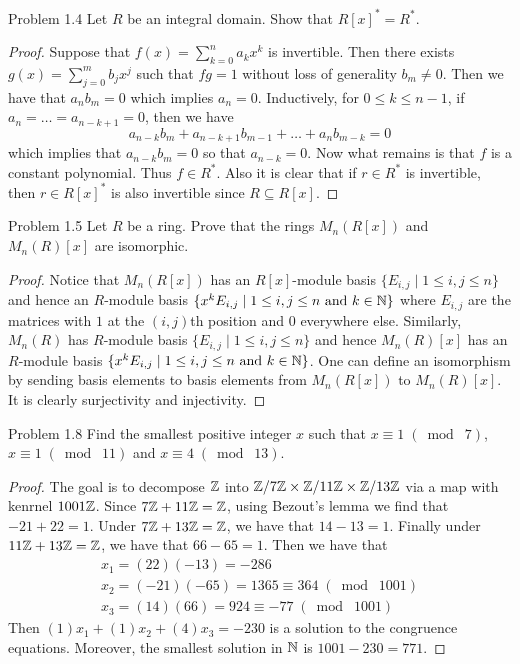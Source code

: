 \documentclass[a4paper]{article}
\begin{document}
\begin{ex}{Problem 1.4}{} Let $R$ be an integral domain. Show that $R[x]^\ast=R^\ast$. \tcbline
\begin{proof}
Suppose that $f(x)=\sum_{k=0}^na_kx^k$ is invertible. Then there exists $g(x)=\sum_{j=0}^mb_jx^j$ such that $fg=1$ without loss of generality $b_m\neq 0$. Then we have that $a_nb_m=0$ which implies $a_n=0$. Inductively, for $0\leq k\leq n-1$, if $a_n=\dots=a_{n-k+1}=0$, then we have $$a_{n-k}b_m+a_{n-k+1}b_{m-1}+\dots+a_nb_{m-k}=0$$ which implies that $a_{n-k}b_m=0$ so that $a_{n-k}=0$. Now what remains is that $f$ is a constant polynomial. Thus $f\in R^\ast$. Also it is clear that if $r\in R^\ast$ is invertible, then $r\in R[x]^\ast$ is also invertible since $R\subseteq R[x]$. 
\end{proof}
\end{ex}

\begin{ex}{Problem 1.5}{} Let $R$ be a ring. Prove that the rings $M_n(R[x])$ and $M_n(R)[x]$ are isomorphic. \tcbline
\begin{proof}
Notice that $M_n(R[x])$ has an $R[x]$-module basis $\{E_{i,j}\;|\;1\leq i,j\leq n\}$ and hence an $R$-module basis $\{x^kE_{i,j}\;|\;1\leq i,j\leq n\text{ and }k\in\mathbb{N}\}$ where $E_{i,j}$ are the matrices with $1$ at the $(i,j)$th position and $0$ everywhere else. Similarly, $M_n(R)$ has $R$-module basis $\{E_{i,j}\;|\;1\leq i,j\leq n\}$ and hence $M_n(R)[x]$ has an $R$-module basis $\{x^kE_{i,j}\;|\;1\leq i,j\leq n\text{ and }k\in\mathbb{N}\}$. One can define an isomorphism by sending basis elements to basis elements from $M_n(R[x])$ to $M_n(R)[x]$. It is clearly surjectivity and injectivity. 
\end{proof}
\end{ex}

\begin{ex}{Problem 1.8}{} Find the smallest positive integer $x$ such that $x\equiv 1\;(\bmod\;7)$, $x\equiv 1\;(\bmod\;11)$ and $x\equiv 4\;(\bmod\;13)$. \tcbline
\begin{proof}
The goal is to decompose $\mathbb{Z}$ into $\mathbb{Z}/7\mathbb{Z}\times\mathbb{Z}/11\mathbb{Z}\times\mathbb{Z}/13\mathbb{Z}$ via a map with kenrnel $1001\mathbb{Z}$. Since $7\mathbb{Z}+11\mathbb{Z}=\mathbb{Z}$, using Bezout's lemma we find that $-21+22=1$. Under $7\mathbb{Z}+13\mathbb{Z}=\mathbb{Z}$, we have that $14-13=1$. Finally under $11\mathbb{Z}+13\mathbb{Z}=\mathbb{Z}$, we have that $66-65=1$. Then we have that 
\begin{gather*}
x_1=(22)(-13)=-286\\
x_2=(-21)(-65)=1365\equiv 364\;(\bmod\;1001)\\
x_3=(14)(66)=924\equiv -77\;(\bmod\;1001)
\end{gather*}
Then $(1)x_1+(1)x_2+(4)x_3=-230$ is a solution to the congruence equations. Moreover, the smallest solution in $\mathbb{N}$ is $1001-230=771$. 
\end{proof}
\end{ex}
\end{document}
